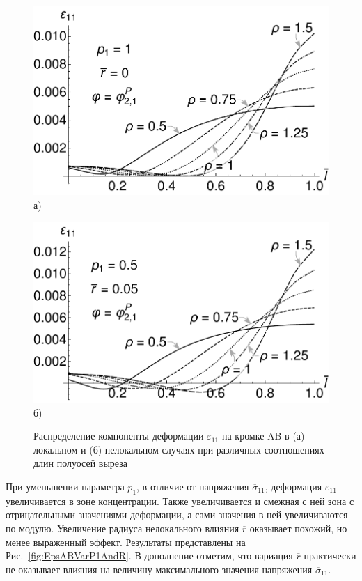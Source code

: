 \begin{figure}[ht]
    \begin{minipage}[b][][b]{0.49\linewidth}\centering
        \includegraphics[width=\linewidth]{pics/KirshABEps11Local.pdf} \\ а)
    \end{minipage}
    \hfill
    \begin{minipage}[b][][b]{0.49\linewidth}\centering
        \includegraphics[width=\linewidth]{pics/KirshABEps11r005p05.pdf} \\ б)
    \end{minipage}
    \caption{Распределение компоненты деформации $\varepsilon_{11}$ на кромке AB в (а) локальном и (б) нелокальном случаях при различных соотношениях длин полуосей выреза}
    \label{fig:EpsABLocAndNonloc}
\end{figure}

При уменьшении параметра $p_1$, в отличие от напряжения $\overline{\sigma}_{11}$, деформация $\varepsilon_{11}$ увеличивается в зоне концентрации. Также увеличивается и смежная с ней зона с отрицательными значениями деформации, а сами значения в ней увеличиваются по модулю. Увеличение радиуса нелокального влияния $\overline{r}$ оказывает похожий, но менее выраженный эффект. Результаты представлены на Рис.~\ref{fig:EpsABVarP1AndR}. В дополнение отметим, что вариация $\overline{r}$ практически не оказывает влияния на величину максимального значения напряжения $\overline{\sigma}_{11}$.

